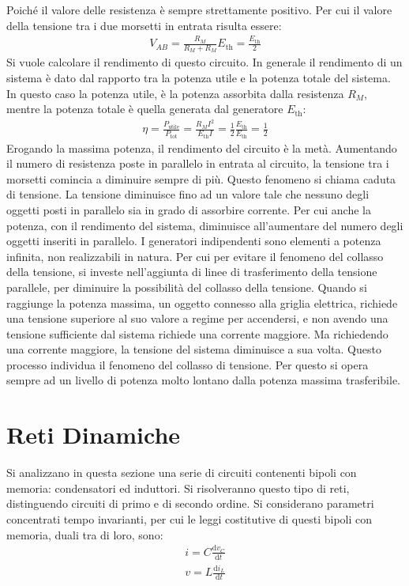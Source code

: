 \documentclass{article}
\newcommand{\df}{\mathrm{d}}
\numberwithin{equation}{subsection}
\begin{document}
Poiché il valore delle resistenza è sempre strettamente positivo. Per cui il valore della tensione tra i due morsetti in entrata risulta essere:
\begin{gather*}
    V_{AB}=\displaystyle\frac{R_M}{R_M+R_M}E_\mathrm{th}=\frac{E_\mathrm{th}}{2}
\end{gather*}
Si vuole calcolare il rendimento di questo circuito. In generale il rendimento di un sistema è dato dal rapporto tra la potenza utile e la potenza totale del sistema. In questo 
caso la potenza utile, è la potenza assorbita dalla resistenza $R_M$, mentre la potenza totale è quella generata dal generatore $E_\mathrm{th}$:
\begin{gather*}
    \eta=\displaystyle\frac{P_\mathrm{utile}}{P_\mathrm{tot}}=\frac{R_{M}I^2}{E_\mathrm{th}I}=\frac{1}{2}\frac{E_\mathrm{th}}{E_\mathrm{th}}=\frac{1}{2}
\end{gather*}
Erogando la massima potenza, il rendimento del circuito è la metà. Aumentando il numero di resistenza poste in parallelo in entrata al circuito, la tensione tra i morsetti 
comincia a diminuire sempre di più. Questo fenomeno si chiama caduta di tensione. La tensione diminuisce fino ad un valore tale che nessuno degli oggetti posti in parallelo 
sia in grado di assorbire corrente. Per cui anche la potenza, con il rendimento del sistema, diminuisce all'aumentare del numero degli oggetti inseriti in parallelo. I 
generatori indipendenti sono elementi a potenza infinita, non realizzabili in natura. Per cui per evitare il fenomeno del collasso della tensione, si investe nell'aggiunta di 
linee di trasferimento della tensione parallele, per diminuire la possibilità del collasso della tensione. Quando si raggiunge la potenza massima, un oggetto connesso alla 
griglia elettrica, richiede una tensione superiore al suo valore a regime per accendersi, e non avendo una tensione sufficiente dal sistema richiede una corrente maggiore. 
Ma richiedendo una corrente maggiore, la tensione del sistema diminuisce a sua volta. Questo processo individua il fenomeno del collasso di tensione. Per questo si opera 
sempre ad un livello di potenza molto lontano dalla potenza massima trasferibile. 

\clearpage 

\section{Reti Dinamiche}

Si analizzano in questa sezione una serie di circuiti contenenti bipoli con memoria: condensatori ed induttori. Si risolveranno questo tipo di reti, distinguendo 
circuiti di primo e di secondo ordine. Si considerano parametri concentrati tempo invarianti, per cui le leggi costitutive di questi bipoli con memoria, duali tra di loro, sono:
\begin{gather*}
    i=\displaystyle C\frac{\df v_C}{\df t}\\
    v=\displaystyle L\frac{\df i_L}{\df t}
\end{gather*}
\end{document}

